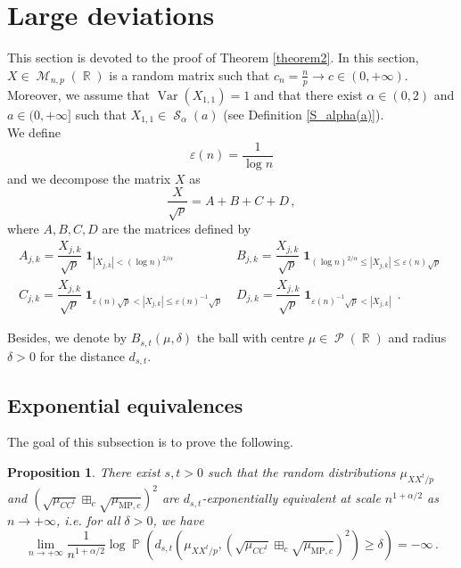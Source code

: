 \documentclass[11pt,a4paper]{article}
\DeclareMathOperator{\R}{\mathbb{R}}
\DeclareMathOperator{\PR}{\mathbb{P}}
\DeclareMathOperator{\MM}{\mathcal{M}}
\DeclareMathOperator{\PP}{\mathcal{P}}
\DeclareMathOperator{\Sz}{\mathcal{S}}
\DeclareMathOperator{\1}{\mathbf{1}}
\DeclareMathOperator{\Var}{\mathrm{Var}}
\newcommand{\mump}{\mu_{\mathrm{MP},c}}
\newtheorem{Proposition}{Proposition}[section]
\theoremstyle{definition}
\begin{document}
\section{Large deviations} \label{section_deviations}

This section is devoted to the proof of Theorem \ref{theorem2}. In this section, $X \in \MM_{n,p}(\R)$ is a random matrix such that $c_n = \frac{n}{p} \to c \in (0,+\infty)$. Moreover, we assume that $\Var(X_{1,1})=1$ and that there exist $\alpha \in (0,2)$ and $a \in (0,+\infty]$ such that $X_{1,1} \in \Sz_{\alpha}(a)$ (see Definition \ref{S_alpha(a)}).\\

We define
\begin{displaymath}
\varepsilon(n) = \frac{1}{\log n}
\end{displaymath}
and we decompose the matrix $X$ as
\begin{equation} \label{decomposition_X}
\frac{X}{\sqrt{p}} = A+B+C+D \, ,
\end{equation}
where $A,B,C,D$ are the matrices defined by
\begin{displaymath}
\begin{array}{lr}
A_{j,k} = \dfrac{X_{j,k}}{\sqrt{p}} \1_{|X_{j,k}| < (\log n)^{2/\alpha}}
& B_{j,k} = \dfrac{X_{j,k}}{\sqrt{p}} \1_{(\log n)^{2/\alpha} \le |X_{j,k}| \le \varepsilon(n) \sqrt{p}} \\
C_{j,k} = \dfrac{X_{j,k}}{\sqrt{p}} \1_{\varepsilon(n) \sqrt{p} < |X_{j,k}| \le \varepsilon(n)^{-1} \sqrt{p}}
& D_{j,k} = \dfrac{X_{j,k}}{\sqrt{p}} \1_{\varepsilon(n)^{-1} \sqrt{p} < |X_{j,k}|} \, .
\end{array}
\end{displaymath}

Besides, we denote by $B_{s,t}(\mu,\delta)$ the ball with centre $\mu \in \PP(\R)$ and radius $\delta>0$ for the distance $d_{s,t}$.


\subsection{Exponential equivalences}

The goal of this subsection is to prove the following.

\begin{Proposition} \label{exponential_equivalence}
There exist $s,t>0$ such that the random distributions $\mu_{XX^t/p}$ and $\left( \sqrt{\mu_{CC^t}} \boxplus_c \sqrt{\mump} \right)^2$ are $d_{s,t}$-exponentially equivalent at scale $n^{1+\alpha/2}$ as $n \to +\infty$, i.e. for all $\delta>0$, we have
\begin{displaymath}
\lim_{n \to +\infty} \frac{1}{n^{1+\alpha/2}} \log \PR \left( d_{s,t} \left( \mu_{XX^t/p} , \left( \sqrt{\mu_{CC^t}} \boxplus_c \sqrt{\mump} \right)^2 \right) \ge \delta \right) = -\infty \, .
\end{displaymath}
\end{Proposition}
\end{document}
